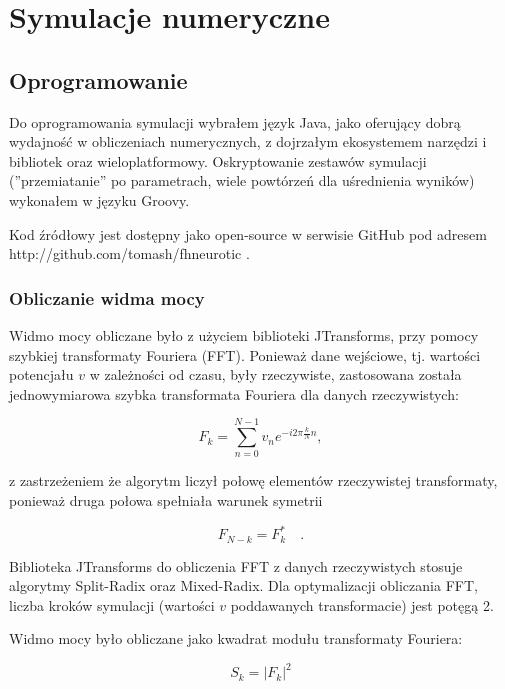   \section{Symulacje numeryczne}
  
  
  \subsection{Oprogramowanie}

  Do oprogramowania symulacji wybrałem język Java, jako oferujący dobrą wydajność w obliczeniach numerycznych, z dojrzałym ekosystemem narzędzi i bibliotek oraz wieloplatformowy. Oskryptowanie zestawów symulacji (''przemiatanie'' po parametrach, wiele powtórzeń dla uśrednienia wyników) wykonałem w języku Groovy.
  
  Kod źródłowy jest dostępny jako open-source w serwisie GitHub pod adresem http://github.com/tomash/fhneurotic .

  \subsubsection{Obliczanie widma mocy}

  Widmo mocy obliczane było z użyciem biblioteki JTransforms, przy pomocy szybkiej transformaty Fouriera (FFT). Ponieważ dane wejściowe, tj. wartości potencjału $v$ w zależności od czasu, były rzeczywiste, zastosowana została jednowymiarowa szybka transformata Fouriera dla danych rzeczywistych:

  \begin{equation}
    F_k = \sum\limits^{N-1}_{n=0} v_n e^{-i2\pi \frac{k}{N} n} ,
  \end{equation}

  z zastrzeżeniem że algorytm liczył połowę elementów rzeczywistej transformaty, ponieważ druga połowa spełniała warunek symetrii

  \begin{equation}
    F_{N-k} = F^{*}_{k} \quad .
  \end{equation}

  Biblioteka JTransforms do obliczenia FFT z danych rzeczywistych stosuje algorytmy Split-Radix oraz Mixed-Radix. Dla optymalizacji obliczania FFT, liczba kroków symulacji (wartości $v$ poddawanych transformacie) jest potęgą 2.

  Widmo mocy było obliczane jako kwadrat modułu transformaty Fouriera:

  \begin{equation}
    S_k = |F_k|^2
  \end{equation}

